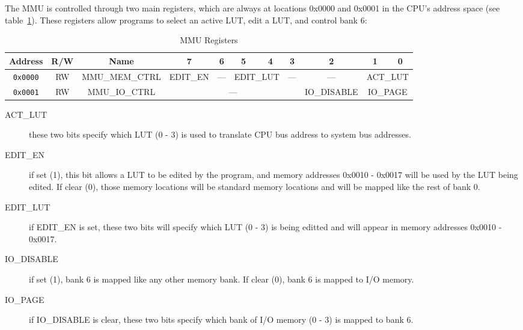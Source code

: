 The MMU is controlled through two main registers, which are always at locations 0x0000 and 0x0001 in the CPU's address space (see table~\ref{tab:mmu_registers}). These registers allow programs to select an active LUT, edit a LUT, and control bank 6:

\begin{table}[h]
	\begin{center}
		\begin{tabular}{| c | c | c || c | c | c | c | c | c | c | c |} \hline
			Address & R/W & Name & 7 & 6 & 5 & 4 & 3 & 2 & 1 & 0 \\ \hline\hline
			\verb+0x0000+ & RW & MMU\_MEM\_CTRL & EDIT\_EN & --- & \multicolumn{2}{|c|}{EDIT\_LUT} & --- & --- & \multicolumn{2}{|c|}{ACT\_LUT} \\ \hline
			\verb+0x0001+ & RW & MMU\_IO\_CTRL & \multicolumn{5}{|c|}{---} & IO\_DISABLE & \multicolumn{2}{|c|}{IO\_PAGE} \\ \hline
		\end{tabular}
	\end{center}
	\caption{MMU Registers}
	\label{tab:mmu_registers}
\end{table}

\begin{description}
	\item[ACT\_LUT] these two bits specify which LUT (0 - 3) is used to translate CPU bus address to system bus addresses.

	\item[EDIT\_EN] if set (1), this bit allows a LUT to be edited by the program, and memory addresses 0x0010 - 0x0017 will be used by the LUT being edited. If clear (0), those memory locations will be standard memory locations and will be mapped like the rest of bank 0.

	\item[EDIT\_LUT] if EDIT\_EN is set, these two bits will specify which LUT (0 - 3) is being editted and will appear in memory addresses 0x0010 - 0x0017.

	\item[IO\_DISABLE] if set (1), bank 6 is mapped like any other memory bank. If clear (0), bank 6 is mapped to I/O memory.

	\item[IO\_PAGE] if IO\_DISABLE is clear, these two bits specify which bank of I/O memory (0 - 3) is mapped to bank 6.
\end{description}


